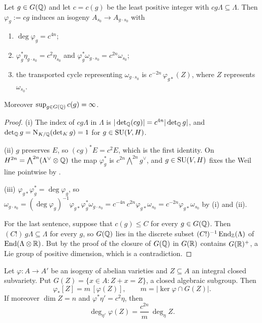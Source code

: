 \begin{lemma}\label{lem:transport}
Let $g\in G(\mathbb{Q})$ and let $c=c(g)$ be the least positive integer with
$cg\Lambda\subseteq\Lambda$. Then $\varphi_{g}:=cg$ induces an isogeny
$A_{s_{0}}\to A_{g\cdot s_{0}}$ with
\begin{enumerate}[label=\textup{(\roman*)},nosep,leftmargin=2.6em]
\item $\deg\varphi_{g}=c^{4n}$;
\item $\varphi_{g}^{*}\eta_{g\cdot s_{0}}=c^{2}\eta_{s_{0}}$ and
  $\varphi_{g}^{*}\omega_{g\cdot s_{0}}=c^{2n}\omega_{s_{0}}$;
\item the transported cycle representing $\omega_{g\cdot s_{0}}$ is
  $c^{-2n}\,\varphi_{g*}(Z)$, where $Z$ represents $\omega_{s_{0}}$.
\end{enumerate}
Moreover $\sup_{g\in G(\mathbb{Q})}c(g)=\infty$.
\end{lemma}

\begin{proof}
(i) The index of $cg\Lambda$ in $\Lambda$ is $|\det_{\mathbb{Q}}(cg)|
=c^{4n}|\det_{\mathbb{Q}}g|$, and $\det_{\mathbb{Q}}g=\mathrm{N}_{K/\mathbb{Q}}(\det_{K}g)=1$ for
$g\in\operatorname{SU}(V,H)$.

(ii) $g$ preserves $E$, so $(cg)^{*}E=c^{2}E$, which is the first identity.
On $H^{2n}=\bigwedge^{2n}(\Lambda^{\vee}\otimes\mathbb{Q})$ the map
$\varphi_{g}^{*}$ is $c^{2n}\bigwedge^{2n}g^{\vee}$, and $g\in\operatorname{SU}(V,H)$ fixes
the Weil line pointwise by .

(iii) $\varphi_{g*}\varphi_{g}^{*}=\deg\varphi_{g}$, so
$\omega_{g\cdot s_{0}}=(\deg\varphi_{g})^{-1}\varphi_{g*}
\varphi_{g}^{*}\omega_{g\cdot s_{0}}
=c^{-4n}\,c^{2n}\varphi_{g*}\omega_{s_{0}}=c^{-2n}\varphi_{g*}\omega_{s_{0}}$
by (i) and (ii).

For the last sentence, suppose that $c(g)\le C$ for every $g\in G(\mathbb{Q})$.
Then $(C!)\,g\Lambda\subseteq\Lambda$ for every $g$, so $G(\mathbb{Q})$ lies in the
discrete subset $(C!)^{-1}\operatorname{End}_{\mathbb{Z}}(\Lambda)$ of $\operatorname{End}(\Lambda\otimes\mathbb{R})$.
But by the proof of  the closure of $G(\mathbb{Q})$ in $G(\mathbb{R})$
contains $G(\mathbb{R})^{+}$, a Lie group of positive dimension, which is a
contradiction.
\end{proof}

\begin{lemma}
\label{lem:multiplicity}
Let $\varphi\colon A\to A'$ be an isogeny of abelian varieties and $Z\subseteq A$
an integral closed subvariety. Put
$G(Z)=\{x\in A:Z+x=Z\}$, a closed algebraic subgroup. Then
\[
  \varphi_{*}[Z]=m\,[\varphi(Z)],\qquad
  m=\bigl|\ker\varphi\cap G(Z)\bigr| .
\]
If moreover $\dim Z=n$ and $\varphi^{*}\eta'=c^{2}\eta$, then
\[
  \deg_{\eta'}\varphi(Z)=\frac{c^{2n}}{m}\,\deg_{\eta}Z .
\]
\end{lemma}

